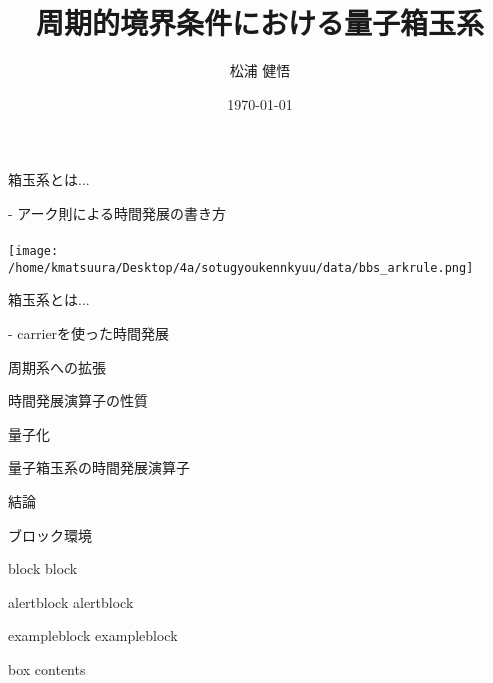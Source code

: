 \documentclass[aspectratio=169, dvipdfmx, 11pt]{beamer} %
\title[Quantinization of Preodic Box Ball System]{周期的境界条件における量子箱玉系}
\author[k.matsuura]{松浦 健悟}
\institute[]{東京大学教養学部統合自然科学科物質基礎科学コース}
\date{\today}
\begin{document}
\maketitle


\begin{frame}{箱玉系とは...}

- アーク則による時間発展の書き方
\\~\\
\texttt{[image: /home/kmatsuura/Desktop/4a/sotugyoukennkyuu/data/bbs\_arkrule.png]}
\end{frame}

\begin{frame}{箱玉系とは...}

- carrierを使った時間発展

\end{frame}


\begin{frame}{周期系への拡張}
\end{frame}

\begin{frame}{時間発展演算子の性質}
\end{frame}

\begin{frame}{量子化}
\end{frame}

\begin{frame}{量子箱玉系の時間発展演算子}
\end{frame}

\begin{frame}{}
\end{frame}

\begin{frame}{}
\end{frame}

\begin{frame}{}
\end{frame}

\begin{frame}{結論}
\end{frame}












\begin{frame}{ブロック環境}
    \begin{block}{block}
    block
    \end{block}
    \begin{alertblock}{alertblock}
    alertblock
    \end{alertblock}
    \begin{exampleblock}{exampleblock}
    exampleblock
    \end{exampleblock}
    \begin{tcolorbox}[colframe=green,
    colback=green!10!white,
    colbacktitle=green!40!white,
    coltitle=black, fonttitle=\bfseries,
    title=My box]
        box contents
    \end{tcolorbox}
\end{frame}
\end{document}
